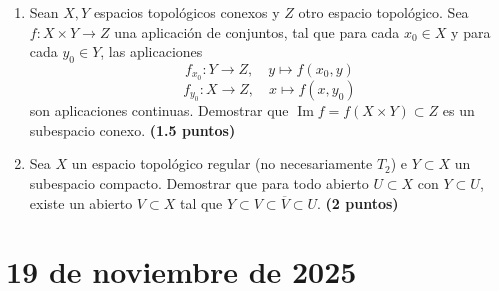 \begin{enumerate}
    \item Sean $X, Y$ espacios topológicos conexos y $Z$ otro espacio topológico. Sea $f : X \times Y \to Z$ una aplicación de conjuntos, tal que para cada $x_0 \in X$ y para cada $y_0 \in Y$, las aplicaciones
    \[
        f_{x_0} : Y \to Z, \quad y \mapsto f(x_0, y)
    \]
    \[
        f_{y_0} : X \to Z, \quad x \mapsto f(x, y_0)
    \]
    son aplicaciones continuas. Demostrar que $\operatorname{Im} f = f(X \times Y) \subset Z$ es un subespacio conexo.
    \hfill \textbf{(1.5 puntos)}

    \item Sea $X$ un espacio topológico regular (no necesariamente $T_2$) e $Y \subset X$ un subespacio compacto. Demostrar que para todo abierto $U \subset X$ con $Y \subset U$, existe un abierto $V \subset X$ tal que $Y \subset V \subset \overline{V} \subset U$.
    \hfill \textbf{(2 puntos)}
\end{enumerate}

\newpage

\section{19 de noviembre de 2025}

